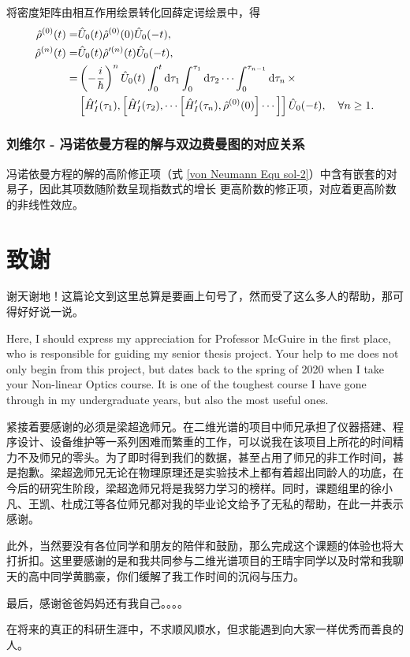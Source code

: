 \documentclass{thesis}
\begin{document}
将密度矩阵由相互作用绘景转化回薛定谔绘景中，得
\begin{align}
    \label{von Neumann Equ sol-1}
    \hat{\rho}^{(0)}(t)=&\hat{U}_0(t)\hat{\rho}^{(0)}(0)\hat{U}_0(-t),\\
    \label{von Neumann Equ sol-2}
    \notag\hat{\rho}^{(n)}(t)=&\hat{U}_0(t)\hat{\rho}'^{(n)}(t)\hat{U}_0(-t),\\
    \notag=&\left(-\frac{i}{\hbar}\right)^n\hat{U}_0(t)\int_0^t\mathrm{d}\tau_1\int_0^{\tau_1}\mathrm{d}\tau_2\cdots\int_0^{\tau_{n-1}}\mathrm{d}\tau_n\,\times\\
    &\left[\hat{H}_I'(\tau_1),\left[\hat{H}_I'(\tau_2),\cdots\left[\hat{H}_I'(\tau_n),\hat{\rho}^{(0)}(0)\right]\cdots\right]\right]\hat{U}_0(-t),\quad\forall n\geq 1.
\end{align}

\subsection{刘维尔 - 冯诺依曼方程的解与双边费曼图的对应关系}
冯诺依曼方程的解的高阶修正项（式 \eqref{von Neumann Equ sol-2}）中含有嵌套的对易子，因此其项数随阶数呈现指数式的增长
更高阶数的修正项，对应着更高阶数的非线性效应。

\backmatter%
\intotoc{\bibname}%

\chapter*{致谢}
谢天谢地！这篇论文到这里总算是要画上句号了，然而受了这么多人的帮助，那可得好好说一说。

Here, I should express my appreciation for Professor McGuire in the first place, who is responsible for guiding my senior thesis project. Your help to me does not only begin from this project, but dates back to the spring of 2020 when I take your Non-linear Optics course. It is one of the toughest course I have gone through in my undergraduate years, but also the most useful ones.

紧接着要感谢的必须是梁超逸师兄。在二维光谱的项目中师兄承担了仪器搭建、程序设计、设备维护等一系列困难而繁重的工作，可以说我在该项目上所花的时间精力不及师兄的零头。为了即时得到我们的数据，甚至占用了师兄的非工作时间，甚是抱歉。梁超逸师兄无论在物理原理还是实验技术上都有着超出同龄人的功底，在今后的研究生阶段，梁超逸师兄将是我努力学习的榜样。同时，课题组里的徐小凡、王凯、杜成江等各位师兄都对我的毕业论文给予了无私的帮助，在此一并表示感谢。

此外，当然要没有各位同学和朋友的陪伴和鼓励，那么完成这个课题的体验也将大打折扣。这里要感谢的是和我共同参与二维光谱项目的王晴宇同学以及时常和我聊天的高中同学黄鹏豪，你们缓解了我工作时间的沉闷与压力。

最后，感谢爸爸妈妈还有我自己。。。。

在将来的真正的科研生涯中，不求顺风顺水，但求能遇到向大家一样优秀而善良的人。
\end{document}
